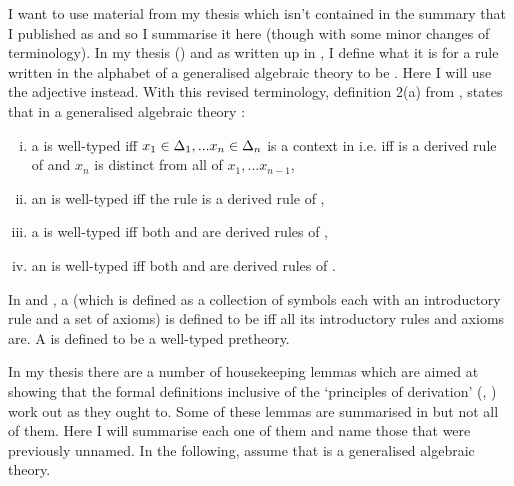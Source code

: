 


\note I want to use material from my thesis  \cite{Cartmell78} which isn't contained in
the summary that I  published as \cite{Cartmell86} and so I summarise it here (though with some minor changes of
terminology).
\note 
In my thesis (\cite{Cartmell78}) and as written up in \cite{Cartmell86}, I define what it is for a rule written in the alphabet of a generalised algebraic theory to be . Here I will use the adjective  instead.
With this revised terminology, definition 2(a) from \cite{Cartmell86}, states that in  a generalised algebraic theory \gatUw:
\begin{enumerate} [(i)]
\item 
a \Trule {} is well-typed  iff 
$x_1 \in \Delta_1,... x_{n} \in \Delta_{n}$ is a context in \gatUw i.e. iff 
 is a derived rule of \gatUw and $x_n$ is distinct from all of $x_1,...x_{n-1}$, 
\item 
an \trule {} is well-typed iff
the rule  is a derived rule of \gatU,
\item 
a \Teqrule {} is well-typed iff
both  and  are derived rules
of \gatU,
\item 
an \teqrule {} is well-typed iff
both  and  are derived rules
of \gatU.
\end{enumerate}
In \cite{Cartmell78} and \cite{Cartmell86}, a  (which is defined as a collection of symbols each with an introductory rule and a set of axioms) is defined to be  iff all its introductory rules and axioms are. A  is defined to be a well-typed pretheory.

\note In my thesis there are a number of housekeeping lemmas which are aimed at showing that the formal definitions inclusive of the `principles of derivation' (\cite{Cartmell78}, \cite{Cartmell86}) work out as they ought to. Some of these lemmas are summarised in \cite{Cartmell86} but not all of them. Here I will summarise each one of them and name those that were previously unnamed. In the following, assume that \gatUw is a generalised algebraic theory.

